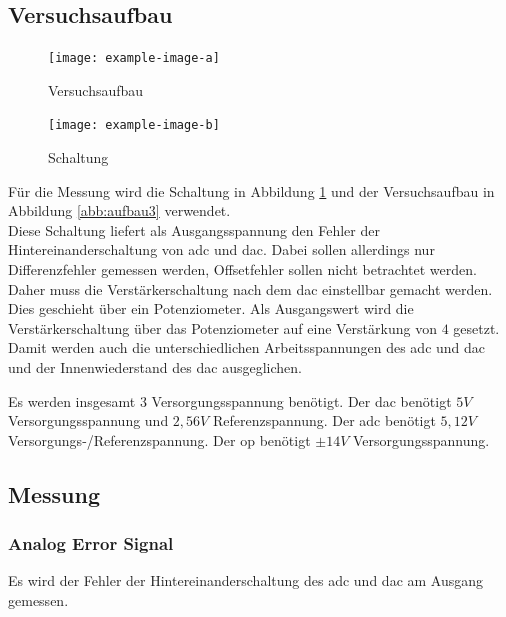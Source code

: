 \documentclass[12pt, a4paper, ngerman]{article}
\begin{document}
\subsection{Versuchsaufbau}

\begin{figure}%
  \centering
  \begin{minipage}[b]{0.49\textwidth} %
    \texttt{[image: example-image-a]}
    \caption{Versuchsaufbau}
    \label{abb:aufbau3}
  \end{minipage}
  \hfill
  \begin{minipage}[b]{0.49\textwidth}
    \texttt{[image: example-image-b]}
    \caption{Schaltung}
    \label{abb:schaltung3}
  \end{minipage}
\end{figure}

Für die Messung wird die Schaltung in Abbildung \ref{abb:schaltung3}
und der Versuchsaufbau in Abbildung \ref{abb:aufbau3} verwendet. \\
Diese Schaltung liefert als Ausgangsspannung den Fehler
der Hintereinanderschaltung von \ac{adc} und \ac{dac}.
Dabei sollen allerdings nur Differenzfehler gemessen werden,
Offsetfehler sollen nicht betrachtet werden.
Daher muss die Verstärkerschaltung nach dem \ac{dac} einstellbar gemacht werden.
Dies geschieht über ein Potenziometer.
Als Ausgangswert wird die Verstärkerschaltung über das Potenziometer auf eine Verstärkung von $4$ gesetzt.
Damit werden auch die unterschiedlichen Arbeitsspannungen des \ac{adc} und \ac{dac} und der Innenwiederstand des \ac{dac} ausgeglichen.

Es werden insgesamt 3 Versorgungsspannung benötigt.
Der \ac{dac} benötigt $5V$ Versorgungsspannung und $2,56V$ Referenzspannung.
Der \ac{adc} benötigt $5,12V$ Versorgungs-/Referenzspannung.
Der \ac{op} benötigt $\pm 14V$ Versorgungsspannung.


\subsection{Messung}

\subsubsection{Analog Error Signal}

Es wird der Fehler der Hintereinanderschaltung des \ac{adc} und \ac{dac} am Ausgang gemessen.
\end{document}
